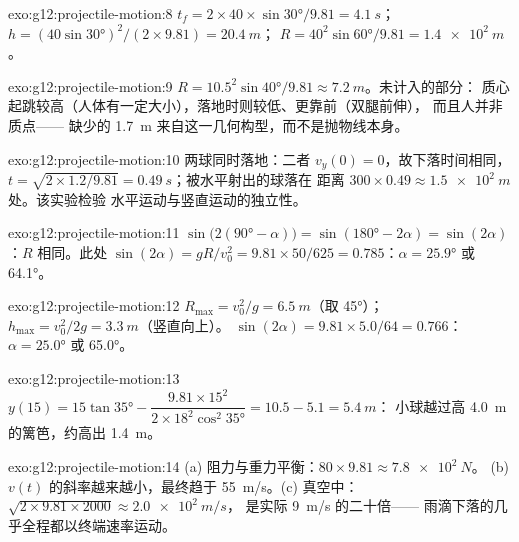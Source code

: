 \begin{solution}{exo:g12:projectile-motion:8}
$t_f = 2 \times 40 \times \sin\ang{30}/9.81 = \qty{4.1}{s}$；
$h = (40\sin\ang{30})^2/(2 \times 9.81) = \qty{20.4}{m}$；
$R = 40^2 \sin\ang{60}/9.81 = \qty{1.4e2}{m}$。
\end{solution}

\begin{solution}{exo:g12:projectile-motion:9}
$R = 10.5^2\sin\ang{40}/9.81 \approx \qty{7.2}{m}$。未计入的部分：
质心起跳较高（人体有一定大小），落地时则较低、更靠前（双腿前伸），
而且人并非质点——
缺少的 \qty{1.7}{m} 来自这一几何构型，而不是抛物线本身。
\end{solution}

\begin{solution}{exo:g12:projectile-motion:10}
两球同时落地：二者 $v_y(0) = 0$，故下落时间相同，
$t = \sqrt{2 \times 1.2/9.81} = \qty{0.49}{s}$；被水平射出的球落在
距离 $300 \times 0.49 \approx \qty{1.5e2}{m}$ 处。该实验检验
水平运动与竖直运动的独立性。
\end{solution}

\begin{solution}{exo:g12:projectile-motion:11}
$\sin\bigl(2(\ang{90}-\alpha)\bigr) = \sin(\ang{180}-2\alpha) =
\sin(2\alpha)$：$R$ 相同。此处 $\sin(2\alpha) = gR/v_0^2 =
9.81 \times 50/625 = 0.785$：$\alpha = \ang{25.9}$ 或 \ang{64.1}。
\end{solution}

\begin{solution}{exo:g12:projectile-motion:12}
$R_{\max} = v_0^2/g = \qty{6.5}{m}$（取 \ang{45}）；
$h_{\max} = v_0^2/2g = \qty{3.3}{m}$（竖直向上）。
$\sin(2\alpha) = 9.81 \times 5.0/64 = 0.766$：$\alpha = \ang{25.0}$
或 \ang{65.0}。
\end{solution}

\begin{solution}{exo:g12:projectile-motion:13}
$y(15) = 15\tan\ang{35} - \dfrac{9.81 \times 15^2}
{2 \times 18^2 \cos^2\ang{35}} = 10.5 - 5.1 = \qty{5.4}{m}$：
小球越过高 \qty{4.0}{m} 的篱笆，约高出 \qty{1.4}{m}。
\end{solution}

\begin{solution}{exo:g12:projectile-motion:14}
(a) 阻力与重力平衡：$80 \times 9.81 \approx \qty{7.8e2}{N}$。
(b) $v(t)$ 的斜率越来越小，最终趋于
\qty{55}{m/s}。(c) 真空中：
$\sqrt{2 \times 9.81 \times 2000} \approx \qty{2.0e2}{m/s}$，
是实际 \qty{9}{m/s} 的二十倍——
雨滴下落的几乎全程都以终端速率运动。
\end{solution}


